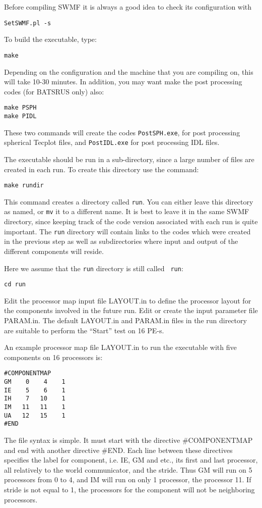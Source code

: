 Before compiling SWMF it is always a good idea to check its configuration
with
\begin{verbatim}
SetSWMF.pl -s
\end{verbatim}
To build the executable, type:
\begin{verbatim}
make
\end{verbatim} 
Depending on the configuration and the machine that you are compiling on, 
this will take 10-30 minutes.  
In addition, you may want make the post processing
codes (for BATSRUS only) also:
\begin{verbatim}
make PSPH
make PIDL
\end{verbatim} 
These two commands will create the codes {\tt PostSPH.exe}, for post
processing spherical Tecplot files, and {\tt PostIDL.exe} 
for post processing IDL files.

The executable should be run in a sub-directory, since a large number
of files are created in each run.  To create this directory use the
command:
\begin{verbatim}
make rundir
\end{verbatim} 
This command creates a directory called {\tt run}.  You can either
leave this directory as named, or {\tt mv} it to a different name.  It
is best to leave it in the same SWMF directory, since
keeping track of the code version associated with each run is quite
important.  The {\tt run} directory will contain links to the codes
which were created in the previous step as well as subdirectories
where input and output of the different components will reside.

Here we assume that the {\tt run} directory is still called {\tt
run}:
\begin{verbatim}
cd run
\end{verbatim} 
Edit the processor map input file LAYOUT.in to define the processor
layout for the components involved in the future run.  Edit or create
the input parameter file PARAM.in.  The default LAYOUT.in and PARAM.in
files in the run directory are suitable to perform the ``Start'' test
on 16 PE-s. 

An example processor map file LAYOUT.in to run the executable with
five components on 16 processors is:
\begin{verbatim}
#COMPONENTMAP
GM    0    4    1
IE    5    6    1
IH    7   10    1
IM   11   11    1
UA   12   15    1
#END
\end{verbatim}
The file syntax is simple. It must start with the directive
\#COMPONENTMAP and end with another directive \#END. Each line between
these directives specifies the label for component, i.e. IE, GM and
etc., its first and last processor, all relatively to the world
communicator, and the stride. Thus GM will run on 5 processors from 0
to 4, and IM will run on only 1 processor, the processor 11.  If
stride is not equal to 1, the processors for the component will not be
neighboring processors.

